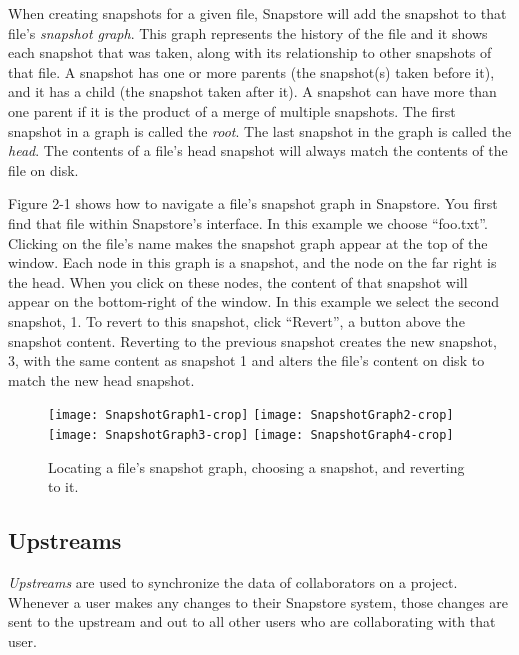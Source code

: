 When creating snapshots for a given file, Snapstore will add the snapshot to that file's \textit{snapshot graph}. This graph represents the history of the file and it shows each snapshot that was taken, along with its relationship to other snapshots of that file. A snapshot has one or more parents (the snapshot(s) taken before it), and it has a child (the snapshot taken after it). A snapshot can have more than one parent if it is the product of a merge of multiple snapshots. The first snapshot in a graph is called the \textit{root}. The last snapshot in the graph is called the \textit{head}. The contents of a file's head snapshot will always match the contents of the file on disk.

Figure 2-1 shows how to navigate a file's snapshot graph in Snapstore. You first find that file within Snapstore's interface. In this example we choose ``foo.txt''. Clicking on the file's name makes the snapshot graph appear at the top of the window. Each node in this graph is a snapshot, and the node on the far right is the head. When you click on these nodes, the content of that snapshot will appear on the bottom-right of the window. In this example we select the second snapshot, 1. To revert to this snapshot, click ``Revert'', a button above the snapshot content. Reverting to the previous snapshot creates the new snapshot, 3, with the same content as snapshot 1 and alters the file's content on disk to match the new head snapshot.

\begin{figure}
\begin{center}
\texttt{[image: SnapshotGraph1-crop]}
\vspace{3 mm}
\texttt{[image: SnapshotGraph2-crop]}
\vspace{3 mm}
\texttt{[image: SnapshotGraph3-crop]}
\texttt{[image: SnapshotGraph4-crop]}
\end{center}
\caption{Locating a file's snapshot graph, choosing a snapshot, and reverting to it.}
\label{arm:fig1}
\end{figure}

\subsection{Upstreams}

\textit{Upstreams} are used to synchronize the data of collaborators on a project. Whenever a user makes any changes to their Snapstore system, those changes are sent to the upstream and out to all other users who are collaborating with that user.

